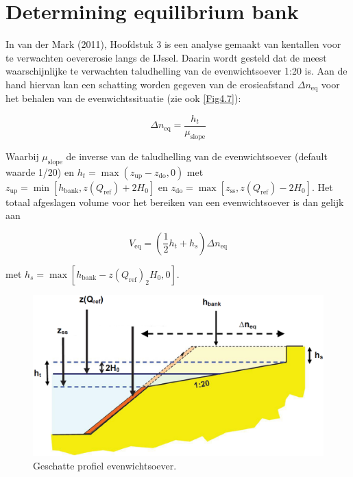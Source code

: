 \section{Determining equilibrium bank} \label{Sec4.6}

In van der Mark (2011), Hoofdstuk 3 is een analyse gemaakt van kentallen voor te verwachten oevererosie langs de IJssel.
Daarin wordt gesteld dat de meest waarschijnlijke te verwachten taludhelling van de evenwichtsoever 1:20 is.
Aan de hand hiervan kan een schatting worden gegeven van de erosieafstand $\Delta n_\text{eq}$ voor het behalen van de evenwichtssituatie (zie ook \autoref{Fig4.7}):

\begin{equation}
\Delta n_\text{eq} = \frac{h_t}{\mu_\text{slope}}
\end{equation}

Waarbij $\mu_\text{slope}$ de inverse van de taludhelling van de evenwichtsoever (default waarde 1/20) en $h_t = \max (z_\text{up} - z_\text{do}, 0)$ met $z_\text{up} = \min [ h_\text{bank}, z(Q_\text{ref}) + 2 H_0]$ en $z_\text{do} = \max [ z_\text{ss}, z(Q_\text{ref}) - 2 H_0 ]$.
Het totaal afgeslagen volume voor het bereiken van een evenwichtsoever is dan gelijk aan

\begin{equation}
V_\text{eq} = ( \frac{1}{2} h_t + h_s ) \Delta n_\text{eq}
\end{equation}

met $h_s = \max [ h_\text{bank} - z(Q_\text{ref}) _ 2 H_0, 0 ]$.


\begin{figure}
\includegraphics[width=\textwidth]{figures/Fig4-7.png}
\caption{Geschatte profiel evenwichtsoever.}
\label{Fig4.7}
\end{figure}

